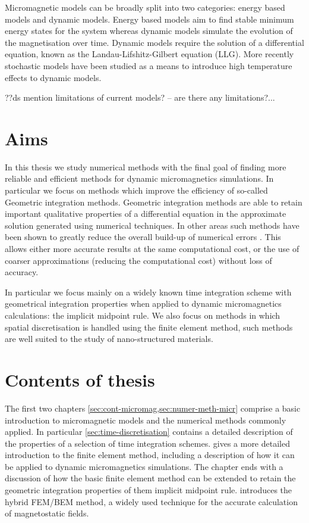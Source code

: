Micromagnetic models can be broadly split into two categories: energy based models and dynamic models.
Energy based models aim to find stable minimum energy states for the system whereas
dynamic models simulate the evolution of the magnetisation over time.
Dynamic models require the solution of a differential equation, known as the Landau-Lifshitz-Gilbert equation (LLG).
More recently stochastic models have been studied as a means to introduce high temperature effects to dynamic models.

??ds mention limitations of current models? -- are there any limitations?...

\section{Aims}

In this thesis we study numerical methods with the final goal of finding more reliable and efficient methods for dynamic micromagnetics simulations.
In particular we focus on methods which improve the efficiency of so-called Geometric integration methods.
Geometric integration methods are able to retain important qualitative properties of a differential equation in the approximate solution generated using numerical techniques.
In other areas such methods have been shown to greatly reduce the overall build-up of numerical errors \cite[77]{Iserles2009}.
This allows either more accurate results at the same computational cost, or the use of coarser approximations (reducing the computational cost) without loss of accuracy.

In particular we focus mainly on a widely known time integration scheme with geometrical integration properties when applied to dynamic micromagnetics calculations: the implicit midpoint rule.
We also focus on methods in which spatial discretisation is handled using the finite element method, such methods are well suited to the study of nano-structured materials.



\section{Contents of thesis}

The first two chapters \cref{sec:cont-micromag,sec:numer-meth-micr} comprise a basic introduction to micromagnetic models and the numerical methods commonly applied.
In particular \cref{sec:time-discretisation} contains a detailed description of the properties of a selection of time integration schemes.
 gives a more detailed introduction to the finite element method, including a description of how it can be applied to dynamic micromagnetics simulations.
The chapter ends with a discussion of how the basic finite element method can be extended to retain the geometric integration properties of them implicit midpoint rule.
 introduces the hybrid FEM/BEM method, a widely used technique for the accurate calculation of magnetostatic fields.

